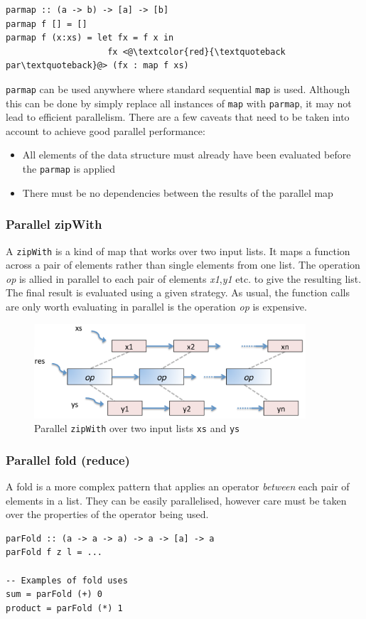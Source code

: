 \documentclass[CS4204-Notes.tex]{subfiles}
\begin{document}
\begin{lstlisting}[caption={Parallel map implementation}]
parmap :: (a -> b) -> [a] -> [b]
parmap f [] = []
parmap f (x:xs) = let fx = f x in
					fx <@\textcolor{red}{\textquoteback par\textquoteback}@> (fx : map f xs)
\end{lstlisting}
\texttt{parmap} can be used anywhere where standard sequential \texttt{map} is used. Although this can be done by simply replace all instances of \texttt{map} with \texttt{parmap}, it may not lead to efficient parallelism. There are a few caveats that need to be taken into account to achieve good parallel performance:
\begin{itemize}
\item All elements of the data structure must already have been evaluated before the \texttt{parmap} is applied
\item There must be no dependencies between the results of the parallel map
\end{itemize}

\subsubsection{Parallel zipWith}
A \texttt{zipWith} is a kind of map that works over two input lists. It maps a function across a pair of elements rather than single elements from one list. The operation \textit{op} is allied in parallel to each pair of elements \textit{x1},\textit{y1} etc. to give the resulting list. The final result is evaluated using a given strategy. As usual, the function calls are only worth evaluating in parallel is the operation \textit{op} is expensive. 
\begin{figure}[H]
\centering
\includegraphics[width=0.9\textwidth, keepaspectratio]{imgs/parallel-zipwith.png}
\caption{Parallel \texttt{zipWith} over two input lists \texttt{xs} and \texttt{ys}}
\end{figure}

\subsubsection{Parallel fold (reduce)}
A fold is a more complex pattern that applies an operator \textit{between} each pair of elements in a list. They can be easily parallelised, however care must be taken over the properties of the operator being used. 
\begin{lstlisting}[caption={Type signature of a parallel fold.}]
parFold :: (a -> a -> a) -> a -> [a] -> a
parFold f z l = ...

-- Examples of fold uses
sum = parFold (+) 0
product = parFold (*) 1
\end{lstlisting}
\end{document}
